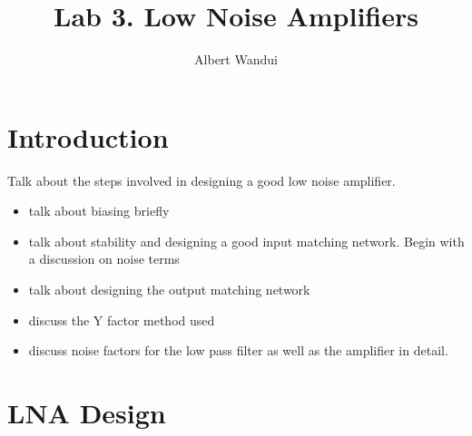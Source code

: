 \documentclass[twocolumn, aps, apl]{revtex4-1}
\begin{document}
\title{Lab 3. Low Noise Amplifiers }
\author{Albert Wandui}
\maketitle

\section*{Introduction}\label{sec:introduction}
Talk about the steps involved in designing a good low noise amplifier.

\begin{itemize}
    \item talk about biasing briefly

    \item talk about stability and designing a good input matching network. Begin with a discussion on noise terms

    \item talk about designing the output matching network

    \item discuss the Y factor method used 

    \item discuss noise factors for the low pass filter as well as the amplifier in detail.
\end{itemize}

\section*{LNA Design}\label{sec:design}
\end{document}

